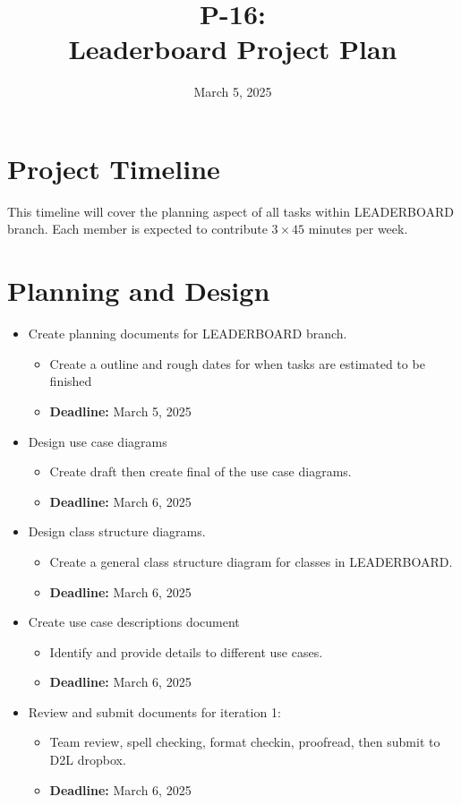 \documentclass{report}
\title{\huge{P-16:}\\Leaderboard Project Plan}
\date{March 5, 2025}
\begin{document}
\maketitle
\section*{Project Timeline}
This timeline will cover the planning aspect of all tasks within LEADERBOARD branch. Each member is expected to contribute \(3\times45\) minutes per week.

\section{Planning and Design}
\begin{itemize}
    \item Create planning documents for LEADERBOARD branch.
    \begin{itemize}
        \item Create a outline and rough dates for when tasks are estimated to be finished
        \item \textbf{Deadline:} March 5, 2025
    \end{itemize}
    \item Design use case diagrams
    \begin{itemize}
        \item Create draft then create final of the use case diagrams.
        \item \textbf{Deadline:} March 6, 2025
    \end{itemize}
    \item Design class structure diagrams.
    \begin{itemize}
        \item Create a general class structure diagram for classes in LEADERBOARD.
        \item \textbf{Deadline:} March 6, 2025
    \end{itemize}
    \item Create use case descriptions document
    \begin{itemize}
        \item Identify and provide details to different use cases.
        \item \textbf{Deadline:} March 6, 2025
    \end{itemize}
    \item Review and submit documents for iteration 1:
    \begin{itemize}
        \item Team review, spell checking, format checkin, proofread, then submit to D2L dropbox.
        \item \textbf{Deadline:} March 6, 2025
    \end{itemize}
\end{itemize}
\end{document}
